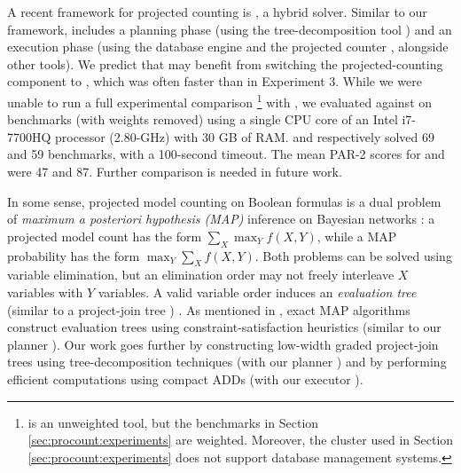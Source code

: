 A recent framework for projected counting is \nest{} \cite{hecher2020taming}, a hybrid solver.
Similar to our framework, \nest{} includes a planning phase (using the tree-decomposition tool \htd{} \cite{AMW17}) and an execution phase (using the database engine  \cite{stonebraker1986design} and the projected counter \projmc{} \cite{lagniez2019recursive}, alongside other tools).
We predict that \nest{} may benefit from switching the projected-counting component to \procount{}, which was often faster than \projmc{} in Experiment 3.
While we were unable to run a full experimental comparison%
\footnote{\nest{} is an unweighted tool, but the benchmarks in Section \ref{sec:procount:experiments} are weighted.
Moreover, the cluster used in Section \ref{sec:procount:experiments} does not support database management systems.}
with \nest{}, we evaluated \nest{} against \procount{} on \wapsBenchmarks{} benchmarks \cite{gupta2019waps} (with weights removed) using a single CPU core of an Intel i7-7700HQ processor (2.80-GHz) with 30 GB of RAM.
\procount{} and \nest{} respectively solved 69 and 59 benchmarks, with a 100-second timeout.
The mean PAR-2 scores for \procount{} and \nest{} were 47 and 87.
Further comparison is needed in future work.


In some sense, projected model counting on Boolean formulas is a dual problem of \emph{maximum a posteriori hypothesis (MAP)} inference \cite{murphy2012machine,maua2015complexity,xue2016solving} on Bayesian networks \cite{pearl1985bayesian}: a projected model count has the form $\sum_X \max_Y f(X, Y)$, while a MAP probability has the form $\max_Y \sum_X f(X, Y)$.
Both problems can be solved using variable elimination, but an elimination order may not freely interleave $X$ variables with $Y$ variables.
A valid variable order induces an \emph{evaluation tree} (similar to a project-join tree%
) \cite{park2004complexity}.
As mentioned in \cite{park2004complexity}, exact MAP algorithms construct evaluation trees using constraint-satisfaction heuristics (similar to our planner \htb).
Our work goes further by constructing low-width graded project-join trees using tree-decomposition techniques (with our planner \Lg) and by performing efficient computations using compact ADDs (with our executor \Dmc).

